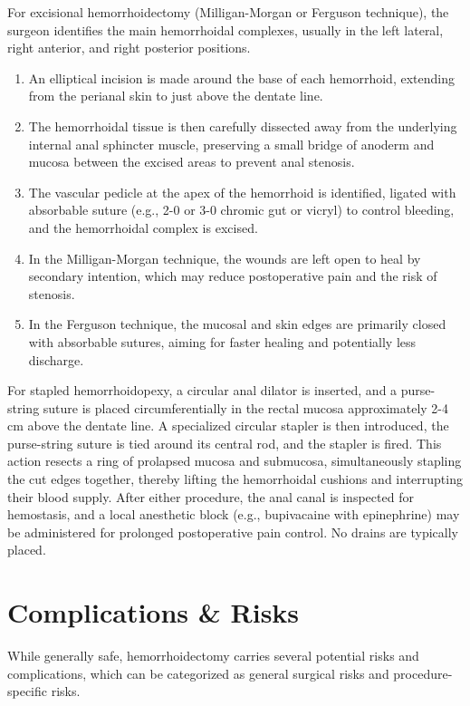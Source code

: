 For excisional hemorrhoidectomy (Milligan-Morgan or Ferguson technique), the surgeon identifies the main hemorrhoidal complexes, usually in the left lateral, right anterior, and right posterior positions.

\begin{enumerate}
  \item An elliptical incision is made around the base of each hemorrhoid, extending from the perianal skin to just above the dentate line.
  \item The hemorrhoidal tissue is then carefully dissected away from the underlying internal anal sphincter muscle, preserving a small bridge of anoderm and mucosa between the excised areas to prevent anal stenosis.
  \item The vascular pedicle at the apex of the hemorrhoid is identified, ligated with absorbable suture (e.g., 2-0 or 3-0 chromic gut or vicryl) to control bleeding, and the hemorrhoidal complex is excised.
  \item In the Milligan-Morgan technique, the wounds are left open to heal by secondary intention, which may reduce postoperative pain and the risk of stenosis.
  \item In the Ferguson technique, the mucosal and skin edges are primarily closed with absorbable sutures, aiming for faster healing and potentially less discharge.
\end{enumerate}

For stapled hemorrhoidopexy, a circular anal dilator is inserted, and a purse-string suture is placed circumferentially in the rectal mucosa approximately 2-4 cm above the dentate line. A specialized circular stapler is then introduced, the purse-string suture is tied around its central rod, and the stapler is fired. This action resects a ring of prolapsed mucosa and submucosa, simultaneously stapling the cut edges together, thereby lifting the hemorrhoidal cushions and interrupting their blood supply. After either procedure, the anal canal is inspected for hemostasis, and a local anesthetic block (e.g., bupivacaine with epinephrine) may be administered for prolonged postoperative pain control. No drains are typically placed.

\section*{Complications \& Risks}
While generally safe, hemorrhoidectomy carries several potential risks and complications, which can be categorized as general surgical risks and procedure-specific risks.

